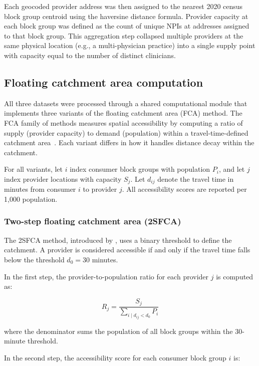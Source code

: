 \documentclass{CUP-JNL-DAP}%
\begin{document}
Each geocoded provider address was then assigned to the nearest 2020 census block group centroid using the haversine distance formula. Provider capacity at each block group was defined as the count of unique NPIs at addresses assigned to that block group. This aggregation step collapsed multiple providers at the same physical location (e.g., a multi-physician practice) into a single supply point with capacity equal to the number of distinct clinicians.

\subsection{Floating catchment area computation}

All three datasets were processed through a shared computational module that implements three variants of the floating catchment area (FCA) method. The FCA family of methods measures spatial accessibility by computing a ratio of supply (provider capacity) to demand (population) within a travel-time-defined catchment area~\citep{luo2003}. Each variant differs in how it handles distance decay within the catchment.

For all variants, let $i$ index consumer block groups with population $P_i$, and let $j$ index provider locations with capacity $S_j$. Let $d_{ij}$ denote the travel time in minutes from consumer $i$ to provider $j$. All accessibility scores are reported per 1{,}000 population.

\subsubsection{Two-step floating catchment area (2SFCA)}

The 2SFCA method, introduced by \citet{luo2003}, uses a binary threshold to define the catchment. A provider is considered accessible if and only if the travel time falls below the threshold $d_0 = 30$ minutes.

In the first step, the provider-to-population ratio for each provider $j$ is computed as:

\begin{equation}
R_j = \frac{S_j}{\displaystyle\sum_{i \mid d_{ij} < d_0} P_i}
\end{equation}

\noindent where the denominator sums the population of all block groups within the 30-minute threshold.

In the second step, the accessibility score for each consumer block group $i$ is:
\end{document}
